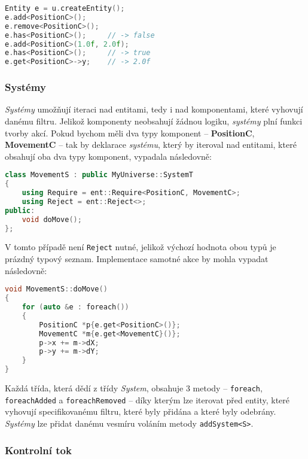 \begin{lstlisting}[backgroundcolor = \color{lightgray}, language = C++, xleftmargin = 2cm, framexleftmargin = 1em, tabsize=4]
Entity e = u.createEntity();
e.add<PositionC>();
e.remove<PositionC>();
e.has<PositionC>();		// -> false
e.add<PositionC>(1.0f, 2.0f);
e.has<PositionC>();		// -> true
e.get<PositionC>->y;	// -> 2.0f
\end{lstlisting}

\subsubsection*{Systémy}

\emph{Systémy} umožňují iteraci nad entitami, tedy i nad komponentami, které vyhovují danému filtru. Jelikož komponenty neobsahují žádnou logiku, \emph{systémy} plní funkci tvorby akcí. Pokud bychom měli dva typy komponent -- \textbf{PositionC}, \textbf{MovementC} -- tak by deklarace \emph{systému}, který by iteroval nad entitami, které obsahují oba dva typy komponent, vypadala následovně:

\begin{lstlisting}[backgroundcolor = \color{lightgray}, language = C++, xleftmargin = 2cm, framexleftmargin = 1em, tabsize=4]
class MovementS : public MyUniverse::SystemT
{
	using Require = ent::Require<PositionC, MovementC>;
	using Reject = ent::Reject<>;
public:
	void doMove();
};
\end{lstlisting}

\noindent V tomto případě není \texttt{Reject} nutné, jelikož výchozí hodnota obou typů je prázdný typový seznam. Implementace samotné akce by mohla vypadat následovně:

\begin{lstlisting}[backgroundcolor = \color{lightgray}, language = C++, xleftmargin = 2cm, framexleftmargin = 1em, tabsize=4]
void MovementS::doMove()
{
	for (auto &e : foreach())
	{
		PositionC *p{e.get<PositionC>()};
		MovementC *m{e.get<MovementC}()};
		p->x += m->dX;
		p->y += m->dY;
	}
}
\end{lstlisting}

\noindent Každá třída, která dědí z třídy \emph{System}, obsahuje 3 metody -- \texttt{foreach}, \texttt{foreachAdded} a \texttt{foreachRemoved} -- díky kterým lze iterovat před entity, které vyhovují specifikovanému filtru, které byly přidána a které byly odebrány. \emph{Systémy} lze přidat danému vesmíru voláním metody \texttt{addSystem<S>}.

\subsubsection*{Kontrolní tok}

